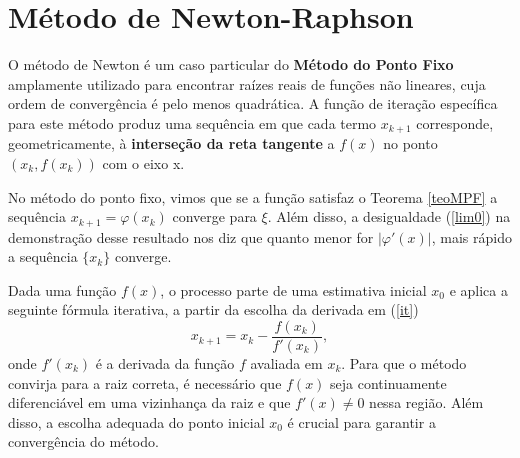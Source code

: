 \section{Método de Newton-Raphson}




O método de Newton é um caso particular do \textbf{Método do Ponto Fixo} amplamente utilizado para encontrar raízes  reais de funções não lineares, cuja ordem de convergência é pelo menos quadrática. A função de iteração específica para este método produz uma sequência em que cada termo $x_{k+1}$ corresponde, geometricamente, à \textbf{interseção da reta tangente} a $f(x)$ no ponto $(x_k, f(x_k))$ com o eixo x. 

No método do ponto fixo, vimos que se a função satisfaz o Teorema \ref{teoMPF} a sequência $x_{k+1} = \varphi(x_k)$ converge para $\xi$. Além disso, a desigualdade (\ref{lim0}) na demonstração desse resultado nos diz que quanto menor for $|\varphi'(x)|$, mais rápido a sequência $\{x_k\}$ converge.

Dada uma função \(f(x)\), o processo parte de uma estimativa inicial \(x_0\) e aplica a seguinte fórmula iterativa, a partir da escolha da derivada em (\ref{it})
\begin{equation}
    x_{k+1} = x_k - \frac{f(x_k)}{f'(x_k)},
\end{equation}
onde \(f'(x_k)\) é a derivada da função \(f\) avaliada em \(x_k\).
Para que o método convirja para a raiz correta, é necessário que \(f(x)\) seja continuamente diferenciável em uma vizinhança da raiz e que \(f'(x) \neq 0\) nessa região. Além disso, a escolha adequada do ponto inicial \(x_0\) é crucial para garantir a convergência do método.

